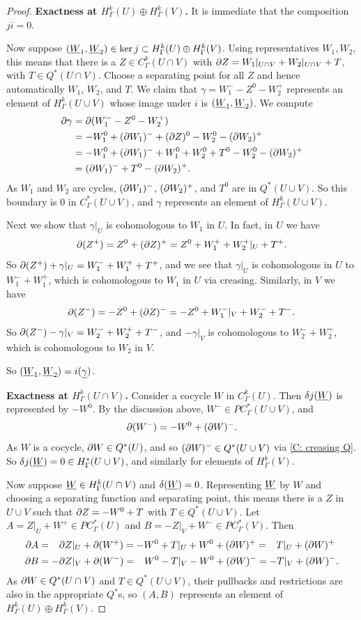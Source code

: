 \begin{proof}
\textbf{Exactness at $H^k_\Gamma(U)\oplus H^k_\Gamma(V)$.}
It is immediate that the composition $ji=0$.

Now suppose $(\underline{W}_1,\underline{W}_2)\in \ker j\subset  H^k_\Gamma(U)\oplus H^k_\Gamma(V)$. Using representatives $W_1,W_2$, this means that there is a $Z\in C^k_\Gamma(U\cap V)$ with  $\partial Z=W_1|_{U\cap V}+W_2|_{U\cap V}+T$, with $T\in Q^*(U\cap V)$. Choose a separating point for all $Z$ and hence automatically $W_1$, $W_2$, and $T$. We claim that $\gamma=W_1^- - Z^0 -W_2^+$ represents an element of $H^k_\Gamma(U\cup V)$ whose image under $i$ is $(\underline{W}_1,\underline{W}_2)$.
We compute
\begin{align*}\partial \gamma&=\partial (W_1^- - Z^0 -W_2^+)\\
&= -W_1^0 +(\partial W_1)^- + (\partial Z)^0 - W_2^0 - (\partial W_2)^+\\
&=-W_1^0 +(\partial W_1)^- + W_1^0+W_2^0+T^0 - W_2^0 - (\partial W_2)^+\\
&=(\partial W_1)^- +T^0  - (\partial W_2)^+.
\end{align*}
As $W_1$ and $W_2$ are cycles, $(\partial W_1)^-$, $(\partial W_2)^+$, and $T^0$ are in $Q^*(U\cup V)$. So this boundary is $0$ in $C^*_\Gamma(U\cup V)$, and  $\gamma$ represents an element of $H^k_\Gamma(U\cup V)$.


Next we show that $\gamma|_U$ is cohomologous to $W_1$ in $U$. In fact,  in $U$ we have
$$\partial (Z^+)= Z^0+(\partial Z)^+=Z^0+ W_1^++ W_2^+|_{U}+T^+.$$ So
$\partial (Z^+) +\gamma|_U=W_1^-+W_1^+ +T^+$, and we see that $\gamma|_U$ is cohomologous in $U$ to $W_1^-+W_1^+$, which is cohomologous to $W_1$ in $U$ via creasing. Similarly, in $V$ we have
 $$\partial (Z^-)= -Z^0+(\partial Z)^-=-Z^0+W_1^-|_{V}+ W_2^-+T^-.$$
So
$\partial(Z^-) - \gamma|_V=W_2^-+W_2^+ +T^-$, and $-\gamma|_V$ is cohomologous to $W_2^-+W_2^+$, which is cohomologous to $W_2$ in $V$.

So $(\underline{W}_1,\underline{W}_2)=i(\underline{\gamma})$.


\textbf{Exactness at $H^k_\Gamma(U\cap V)$.}
Consider a cocycle $W$ in $C^k_\Gamma(U)$. Then $\delta j(\underline{W})$ is represented by $-W^0$. By the discussion above, $W^-\in PC^*_\Gamma(U\cup V)$, and   $$\partial (W^-)= -W^0+ (\partial W)^-.$$ As $W$ is a cocycle, $\partial W\in Q^*(U)$, and so $(\partial W)^-\in Q^*(U\cup V)$ via \cref{C: creasing Q}. So $\delta j(\underline{W})=0\in H^*_\Gamma(U\cup V)$, and similarly for elements of $H^k_\Gamma(V)$.


Now suppose $\underline{W}\in H^k_\Gamma(U\cap V)$ and $\delta(\underline{W})=0$. Representing $\underline{W}$ by $W$ and choosing a separating function and separating point, this means there is a $Z$ in $U\cup V$ such that $\partial Z=-W^0+T$ with $T\in Q^*(U\cup V)$. Let $A=Z|_U+ W^+\in PC^*_\Gamma(U)$ and $B=-Z|_V +W^-\in PC^*_\Gamma(V)$. Then
\begin{align*}
\partial A&=\phantom{-}\partial Z|_U+ \partial( W^+)= -W^0+T|_U +W^0+(\partial W)^{+}=\phantom{-}T|_U+(\partial W)^{+}\\
\partial B&=-\partial Z|_V+ \partial (W^-)= \phantom{-}W^0-T|_V -W^0+(\partial W)^{-}=-T|_V+(\partial W)^{-}.
\end{align*}
As $\partial W\in Q^*(U\cap V)$ and $T\in Q^*(U\cup V)$, their pullbacks and restrictions are also in the appropriate $Q^*$s, so $(A,B)$ represents an element of $H^k_\Gamma(U)\oplus H^k_\Gamma(V)$.


\end{proof}
